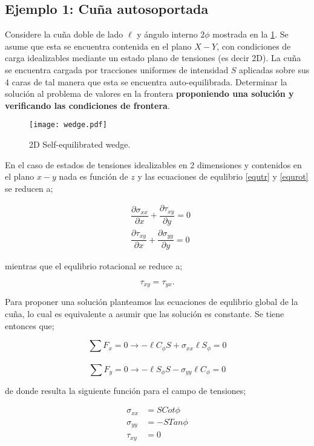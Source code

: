\documentclass[../notas medios.tex]{subfiles}
\begin{document}
\subsection*{Ejemplo 1: Cuña autosoportada}

Considere la cuña doble de lado $\ell$ y ángulo interno $2 \phi$ mostrada en la \cref{WEDGE}. Se asume que esta se encuentra contenida en el plano $X-Y$, con condiciones de carga idealizables mediante un estado plano de tensiones (es decir 2D). La cuña se encuentra cargada por tracciones uniformes de intensidad $S$ aplicadas sobre sus 4 caras de tal manera que esta se encuentra auto-equilibrada. Determinar la solución al problema de valores en la frontera {\bf proponiendo una solución y verificando las condiciones de frontera}.

%
\begin{figure}[H]
\centering
\texttt{[image: wedge.pdf]}
\caption{2D Self-equilibrated wedge.}
\label{WEDGE}
\end{figure}

%
En el caso de estados de tensiones idealizables en 2 dimensiones y contenidos en el plano $x-y$ nada es función de $z$ y las ecuaciones de equlibrio \cref{equtr} y \cref{equrot} se reducen a;

\begin{equation}
\begin{aligned}
&\dfrac{\partial\sigma_{xx}}{\partial x}+\dfrac{\partial\tau_{xy}}{\partial y}=0\\
&\dfrac{\partial\tau_{xy}}{\partial x}+\dfrac{\partial\sigma_{yy}}{\partial y}=0
\end{aligned}
\label{equilibrium}
\end{equation}

mientras que el equlibrio rotacional se reduce a;

\[{\tau _{xy}} = {\tau _{yx}}.\]

Para proponer una solución planteamos las ecuaciones de equlibrio global de la cuña, lo cual es equivalente a asumir que las solución es constante. Se tiene entonces que;


\[\sum F_x=0 \longrightarrow -\ell C_\phi S+\sigma_{xx}\ell S_\phi=0\]\\
\[\sum F_y=0 \longrightarrow -\ell S_\phi S-\sigma_{yy}\ell C_\phi=0\] 

de donde resulta la siguiente función para el campo de tensiones;

\begin{equation}
\begin{aligned}
\sigma_{xx}&=SCot\phi\\
\sigma_{yy}&=-STan\phi\\
\tau_{xy}&=0
\end{aligned}
\label{solution}
\end{equation}
\end{document}
